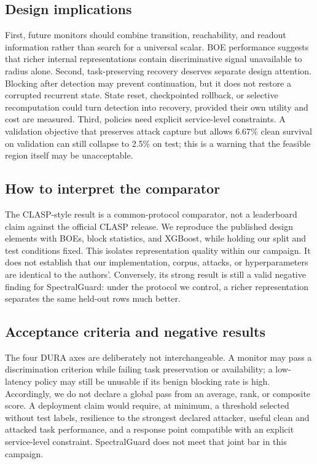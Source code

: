 \documentclass[sigconf]{acmart}
\begin{document}
\subsection{Design implications}
First, future monitors should combine transition, reachability, and readout
information rather than search for a universal scalar. BOE performance suggests
that richer internal representations contain discriminative signal unavailable
to radius alone. Second, task-preserving recovery deserves separate design
attention. Blocking after detection may prevent continuation, but it does not
restore a corrupted recurrent state. State reset, checkpointed rollback, or
selective recomputation could turn detection into recovery, provided their own
utility and cost are measured. Third, policies need explicit service-level
constraints. A validation objective that preserves attack capture but allows
6.67\% clean survival on validation can still collapse to 2.5\% on test; this
is a warning that the feasible region itself may be unacceptable.

\subsection{How to interpret the comparator}
The CLASP-style result is a common-protocol comparator, not a leaderboard claim
against the official CLASP release. We reproduce the published design elements
with BOEs, block statistics, and XGBoost, while holding our split and test
conditions fixed. This isolates representation quality within our campaign.
It does not establish that our implementation, corpus, attacks, or hyperparameters
are identical to the authors'. Conversely, its strong result is still a valid
negative finding for SpectralGuard: under the protocol we control, a richer
representation separates the same held-out rows much better.

\subsection{Acceptance criteria and negative results}
The four DURA axes are deliberately not interchangeable. A monitor may pass a
discrimination criterion while failing task preservation or availability; a
low-latency policy may still be unusable if its benign blocking rate is high.
Accordingly, we do not declare a global pass from an average, rank, or composite
score. A deployment claim would require, at minimum, a threshold selected
without test labels, resilience to the strongest declared attacker, useful
clean and attacked task performance, and a response point compatible with an
explicit service-level constraint. SpectralGuard does not meet that joint bar
in this campaign.
\end{document}
